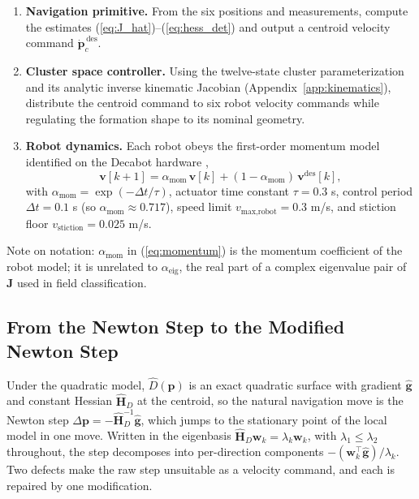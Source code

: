 \documentclass[lettersize,journal]{IEEEtran}
\begin{document}
\begin{enumerate}
    \item \textbf{Navigation primitive.} From the six positions and
          measurements, compute the estimates
          (\ref{eq:J_hat})--(\ref{eq:hess_det}) and output a centroid
          velocity command $\dot{\mathbf{p}}_c^{\,\text{des}}$.
    \item \textbf{Cluster space controller.} Using the twelve-state
          cluster parameterization and its analytic inverse kinematic
          Jacobian (Appendix~\ref{app:kinematics}), distribute the
          centroid command to six robot velocity commands while
          regulating the formation shape to its nominal geometry.
    \item \textbf{Robot dynamics.} Each robot obeys the first-order
          momentum model identified on the Decabot hardware \cite{14},
          \begin{equation}
              \mathbf{v}[k+1] = \alpha_{\text{mom}}\,\mathbf{v}[k]
              + (1 - \alpha_{\text{mom}})\,\mathbf{v}^{\text{des}}[k],
              \label{eq:momentum}
          \end{equation}
          with $\alpha_{\text{mom}} = \exp(-\Delta t/\tau)$, actuator
          time constant $\tau = 0.3$ s, control period $\Delta t = 0.1$ s
          (so $\alpha_{\text{mom}} \approx 0.717$), speed limit
          $v_{\text{max,robot}} = 0.3$ m/s, and stiction floor
          $v_{\text{stiction}} = 0.025$ m/s.
\end{enumerate}

Note on notation: $\alpha_{\text{mom}}$ in (\ref{eq:momentum}) is the
momentum coefficient of the robot model; it is unrelated to
$\alpha_{\text{eig}}$, the real part of a complex eigenvalue pair of
$\mathbf{J}$ used in field classification.

\subsection{From the Newton Step to the Modified Newton Step}
\label{sec:mod_newton}

Under the quadratic model, $\hat{D}(\mathbf{p})$ is an exact quadratic
surface with gradient $\hat{\mathbf{g}}$ and constant Hessian
$\hat{\mathbf{H}}_D$ at the centroid, so the natural navigation move is
the Newton step $\Delta\mathbf{p} = -\hat{\mathbf{H}}_D^{-1}
\hat{\mathbf{g}}$, which jumps to the stationary point of the local
model in one move. Written in the eigenbasis
$\hat{\mathbf{H}}_D \mathbf{w}_k = \lambda_k \mathbf{w}_k$, with
$\lambda_1 \leq \lambda_2$ throughout, the step decomposes into
per-direction components $-(\mathbf{w}_k^\top
\hat{\mathbf{g}})/\lambda_k$. Two defects make the raw step unsuitable
as a velocity command, and each is repaired by one modification.
\end{document}
